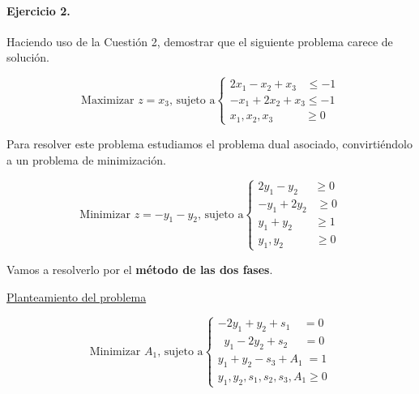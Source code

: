 \documentclass[12pt]{scrartcl}
\begin{document}
\vspace{1em}

\begin{boxF}
\paragraph*{Ejercicio 2.}Haciendo uso de la Cuestión 2, demostrar que el siguiente problema carece de solución.

$$
\text{Maximizar } z=x_3\text{, sujeto a}
\begin{cases} 
2x_1 - x_2 + x_3 \;\;\; \leq -1 \\
-x_1 + 2x_2 + x_3 \leq -1 \\
x_1, x_2, x_3 \;\;\;\;\;\;\;\;\;\; \geq 0
\end{cases}
$$
\end{boxF}

\vspace{0.5em}

Para resolver este problema estudiamos el problema dual asociado, convirtiéndolo a un problema de minimización.

$$
\text{Minimizar } z=-y_1 -y_2 \text{, sujeto a}
\begin{cases} 
2y_1 - y_2  \;\;\;\;\; \geq 0 \\
-y_1 + 2y_2 \;\;\;  \geq 0 \\
y_1 + y_2  \;\;\;\;\;\;\; \geq 1 \\
y_1, y_2  \;\;\;\;\;\;\;\;\;\;   \geq 0
\end{cases}
$$


\vspace{1em}

Vamos a resolverlo por el \textbf{método de las dos fases}.


\vspace{0.5em}


\begin{center}
    \underline{Planteamiento del problema}
\end{center}

$$
\text{Minimizar } A_1 \text{, sujeto a}
\begin{cases} 
-2y_1 + y_2 + s_1 \;\;\;\; = 0 \\
\;\; y_1 - 2y_2 + s_2 \;\;\;\;\;  = 0 \\
y_1 + y_2 - s_3 + A_1 \; = 1 \\
y_1, y_2, s_1, s_2, s_3, A_1    \geq 0
\end{cases}
$$

\vspace{0.5em}
\end{document}
